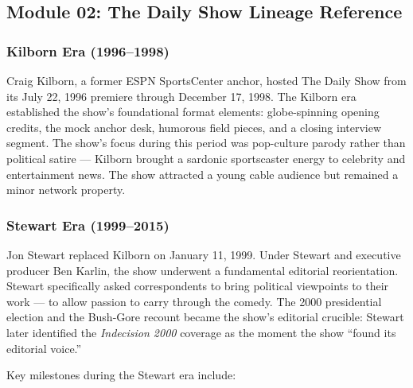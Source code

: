 \documentclass[11pt,letterpaper]{article}
\begin{document}
\subsection{Module 02: The Daily Show Lineage Reference}

\subsubsection{Kilborn Era (1996--1998)}

Craig Kilborn, a former ESPN SportsCenter anchor, hosted The Daily Show from its July 22, 1996 premiere through December 17, 1998. The Kilborn era established the show's foundational format elements: globe-spinning opening credits, the mock anchor desk, humorous field pieces, and a closing interview segment. The show's focus during this period was pop-culture parody rather than political satire --- Kilborn brought a sardonic sportscaster energy to celebrity and entertainment news. The show attracted a young cable audience but remained a minor network property.

\subsubsection{Stewart Era (1999--2015)}

Jon Stewart replaced Kilborn on January 11, 1999. Under Stewart and executive producer Ben Karlin, the show underwent a fundamental editorial reorientation. Stewart specifically asked correspondents to bring political viewpoints to their work --- to allow passion to carry through the comedy. The 2000 presidential election and the Bush-Gore recount became the show's editorial crucible: Stewart later identified the \textit{Indecision 2000} coverage as the moment the show ``found its editorial voice.''

Key milestones during the Stewart era include:
\end{document}

